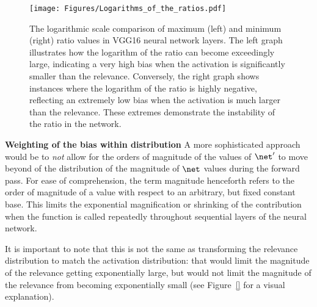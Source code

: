 \begin{figure}[ht!]
	\begin{center}
		\texttt{[image: Figures/Logarithms\_of\_the\_ratios.pdf]}
	\end{center}
	\caption{The logarithmic scale comparison of maximum (left) and minimum (right) ratio values in VGG16 neural network layers. The left graph illustrates how the logarithm of the ratio can become exceedingly large, indicating a very high bias when the activation is significantly smaller than the relevance. Conversely, the right graph shows instances where the logarithm of the ratio is highly negative, reflecting an extremely low bias when the activation is much larger than the relevance. These extremes demonstrate the instability of the ratio in the network.}
	\label{fig:exponential}
\end{figure} 
\newpage
\textbf{Weighting of the bias within distribution}
\newline
\newline
A more sophisticated approach would be to \emph{not} allow for the orders of magnitude of the values of $\net^\prime$ to move beyond of the distribution of the magnitude of $\net$ values during the forward pass. For ease of comprehension, the term magnitude henceforth refers to the order of magnitude of a value with respect to an arbitrary, but fixed constant base. This limits the exponential magnification or shrinking of the contribution when the function is called repeatedly throughout sequential layers of the neural network. 


It is important to note that this is not the same as transforming the relevance distribution to match the activation distribution: that would limit the magnitude of the relevance getting exponentially large, but would not limit the magnitude of the relevance from becoming exponentially small (see Figure~\ref{} for a visual explanation). 


